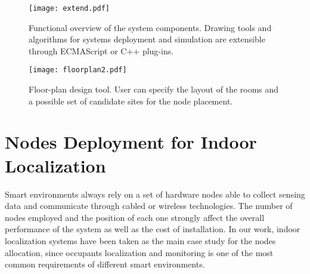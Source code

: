 \begin{figure}[h!tb]
\centering\texttt{[image: extend.pdf]}
\caption[Functional overview of the system components of the CAD application.]{Functional overview of the system components. Drawing tools and algorithms for systems deployment and simulation are extensible through ECMAScript or C++ plug-ins.}
\end{figure}

\begin{figure}
\centering\texttt{[image: floorplan2.pdf]}
\caption[Graphical interface of the floor-plan design of the CAD tool.]{Floor-plan design tool. User can specify the layout of the rooms and a possible set of candidate sites for the node placement.}
\label{fig:floor}
\end{figure}

\section{Nodes Deployment for Indoor Localization}\label{sec:problem}
Smart environments always rely on a set of hardware nodes able to collect sensing data and communicate through cabled or wireless technologies. The number of nodes employed and the position of each one strongly affect the overall performance of the system as well as the cost of installation.
In our work, indoor localization systems have been taken as the main case study for the nodes allocation, since occupants localization and monitoring is one of the most common requirements of different smart environments.

